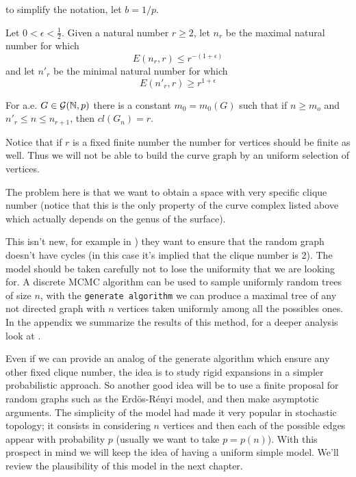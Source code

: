 to simplify the notation, let $b=1/p$.

Let $0<\epsilon<\frac{1}{2}$. Given a natural number $r \geq 2$, let $n_r$ be the maximal natural number for which
$$E(n_r, r) \leq r^{-(1+\epsilon)}$$
and let $n'_{r}$ be the minimal natural number for which
$$E(n'_{r}, r)\geq r^{1+\epsilon}$$

\begin{theorem}
For a.e. $G \in \mathcal{G}(\mathbb{N},p)$ there is a constant $m_0 = m_{0}(G)$ such that if $n \geq m_o$ and $n'_{r} \leq n \leq n_{r+1}$, then $cl(G_{n}) = r$.
\end{theorem}

Notice that if $r$ is a fixed finite number the number for vertices should be finite as well. Thus we will not be able to build the curve graph by an uniform selection of vertices. 

The problem here is that we want to obtain a space with very specific clique number (notice that this is the only property of the curve complex listed above which actually depends on the genus of the surface). 

This isn't new, for example in \cite{Alcazar15}) they want to ensure that the random graph doesn't have cycles (in this case it's implied that the clique number is 2). The model should be taken carefully not to lose the uniformity that we are looking for. A discrete MCMC algorithm can be used to sample uniformly random trees of size $n$, with the \texttt{generate algorithm} we can produce a maximal tree of any not directed graph with $n$ vertices taken uniformly among all the possibles ones. In the appendix we summarize the results of this method, for a deeper analysis look at \cite{Broder89}.

Even if we can provide an analog of the generate algorithm which ensure any other fixed clique number, the idea is to study rigid expansions in a simpler probabilistic approach. So another good idea will be to use a finite proposal for random graphs such as the Erdös-Rényi model, and then make asymptotic arguments. The simplicity of the model had made it very popular in stochastic topology; it consists in considering $n$ vertices and then each of the possible edges appear with probability $p$ (usually we want to take $p=p(n)$). With this prospect in mind we will keep the idea of having a uniform simple model. We'll review the plausibility of this model in the next chapter.



